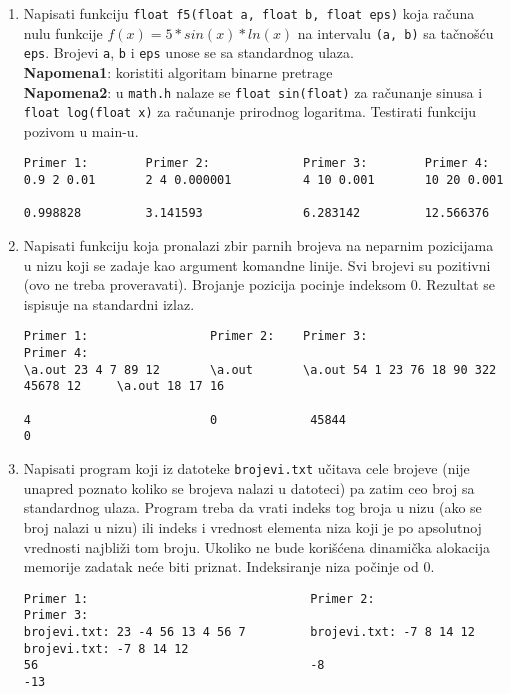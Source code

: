 \begin{enumerate}
\item Napisati funkciju \verb|float f5(float a, float b, float eps)| koja
ra\v cuna nulu funkcije $f(x) = 5*sin(x)*ln(x)$ na intervalu \verb|(a, b)| sa ta\v cno\v s\'cu \verb|eps|. Brojevi
\verb|a|, \verb|b| i \verb|eps| unose se sa standardnog ulaza.\\
\textbf{Napomena1}: koristiti algoritam binarne pretrage\\
\textbf{Napomena2}: u \verb|math.h| nalaze se \verb|float sin(float)| za ra\v cunanje sinusa i
 \verb|float log(float x)| za ra\v cunanje prirodnog logaritma.
Testirati funkciju pozivom u main-u.

\begin{verbatim}
Primer 1:        Primer 2:             Primer 3:        Primer 4:
0.9 2 0.01       2 4 0.000001          4 10 0.001       10 20 0.001

0.998828         3.141593              6.283142         12.566376
\end{verbatim}


\item Napisati funkciju koja pronalazi zbir parnih brojeva na neparnim pozicijama u nizu koji se zadaje kao argument komandne linije. Svi brojevi su pozitivni (ovo ne treba proveravati).
Brojanje pozicija pocinje indeksom 0. Rezultat se ispisuje na standardni izlaz.

\begin{verbatim}
Primer 1:                 Primer 2:    Primer 3:                                Primer 4:
\a.out 23 4 7 89 12       \a.out       \a.out 54 1 23 76 18 90 322 45678 12     \a.out 18 17 16

4                         0             45844                                   0
\end{verbatim}


\item Napisati program koji iz datoteke \verb|brojevi.txt| u\v citava cele brojeve (nije unapred poznato koliko
se brojeva nalazi u datoteci) pa zatim ceo broj sa standardnog ulaza. Program treba da vrati indeks
tog broja u nizu (ako se broj nalazi u nizu) ili indeks i vrednost elementa niza koji je po apsolutnoj
vrednosti najbli\v zi tom broju. Ukoliko ne bude kori\v s\'cena dinami\v cka alokacija memorije zadatak ne\'ce
biti priznat. Indeksiranje niza po\v cinje od 0.

\begin{verbatim}
Primer 1:                               Primer 2:                        Primer 3:
brojevi.txt: 23 -4 56 13 4 56 7         brojevi.txt: -7 8 14 12          brojevi.txt: -7 8 14 12
56                                      -8                               -13


\end{verbatim}
\end{enumerate}
